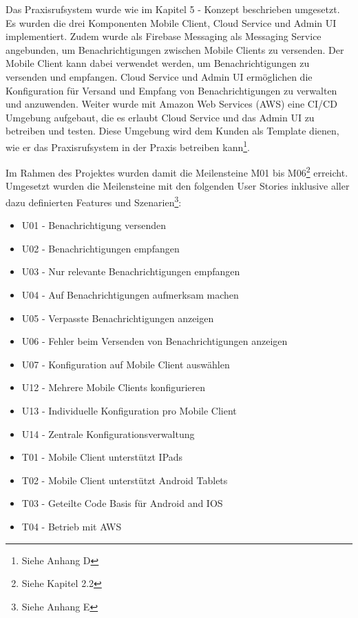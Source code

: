 Das Praxisrufsystem wurde wie im Kapitel 5 - Konzept beschrieben umgesetzt.
Es wurden die drei Komponenten Mobile Client, Cloud Service und Admin UI implementiert.
Zudem wurde als Firebase Messaging als Messaging Service angebunden, um Benachrichtigungen zwischen Mobile Clients zu versenden.
Der Mobile Client kann dabei verwendet werden, um Benachrichtigungen zu versenden und empfangen.
Cloud Service und Admin UI ermöglichen die Konfiguration für Versand und Empfang von Benachrichtigungen zu verwalten und anzuwenden.
Weiter wurde mit Amazon Web Services (AWS) eine CI/CD Umgebung aufgebaut, die es erlaubt Cloud Service und das Admin UI zu betreiben und testen.
Diese Umgebung wird dem Kunden als Template dienen, wie er das Praxisrufsystem in der Praxis betreiben kann\footnote{Siehe Anhang D}.

Im Rahmen des Projektes wurden damit die Meilensteine M01 bis M06\footnote{Siehe Kapitel 2.2} erreicht.
Umgesetzt wurden die Meilensteine mit den folgenden User Stories inklusive aller dazu definierten Features und Szenarien\footnote{Siehe Anhang E}:

\begin{itemize}
    \item U01 - Benachrichtigung versenden
    \item U02 - Benachrichtigungen empfangen
    \item U03 - Nur relevante Benachrichtigungen empfangen
    \item U04 - Auf Benachrichtigungen aufmerksam machen
    \item U05 - Verpasste Benachrichtigungen anzeigen
    \item U06 - Fehler beim Versenden von Benachrichtigungen anzeigen
    \item U07 - Konfiguration auf Mobile Client auswählen
    \item U12 - Mehrere Mobile Clients konfigurieren
    \item U13 - Individuelle Konfiguration pro Mobile Client
    \item U14 - Zentrale Konfigurationsverwaltung
    \item T01 - Mobile Client unterstützt IPads
    \item T02 - Mobile Client unterstützt Android Tablets
    \item T03 - Geteilte Code Basis für Android and IOS
    \item T04 - Betrieb mit AWS
\end{itemize}

